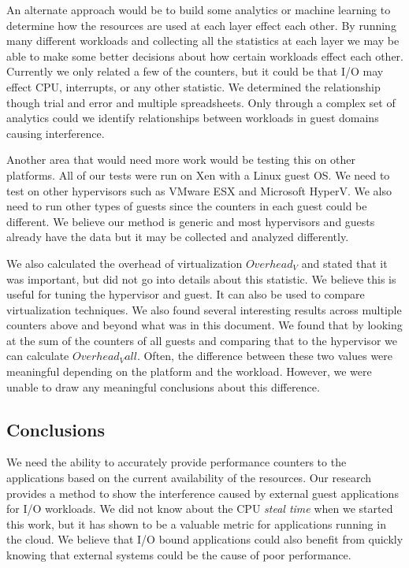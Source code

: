 An alternate approach would be to build some analytics or machine learning to determine how the resources are used at each layer effect each other.  By running many different workloads and collecting all the statistics at each layer we may be able to make some better decisions about how certain workloads effect each other.  Currently we only related a few of the counters, but it could be that I/O may effect CPU, interrupts, or any other statistic.  We determined the relationship though trial and error and multiple spreadsheets.  Only through a complex set of analytics could we identify relationships between workloads in guest domains causing interference.

Another area that would need more work would be testing this on other platforms.  All of our tests were run on Xen with a Linux guest OS.  We need to test on other hypervisors such as VMware ESX and Microsoft HyperV.  We also need to run other types of guests since the counters in each guest could be different.  We believe our method is generic and most hypervisors and guests already have the data but it may be collected and analyzed differently.

We also calculated the overhead of virtualization $Overhead_V$ and stated that it was important, but did not go into details about this statistic.  We believe this is useful for tuning the hypervisor and guest.  It can also be used to compare virtualization techniques.  We also found several interesting results across multiple counters above and beyond what was in this document.  We found that by looking at the sum of the counters of all guests and comparing that to the hypervisor we can calculate $Overhead_Vall$.  Often, the difference between these two values were meaningful depending on the platform and the workload.  However, we were unable to draw any meaningful conclusions about this difference. 


\subsection{Conclusions}
We need the ability to accurately provide performance counters to the applications based on the current availability of the resources.  Our research provides a method to show the interference caused by external guest applications for I/O workloads.  We did not know about the CPU \emph{steal time} when we started this work, but it has shown to be a valuable metric for applications running in the cloud.  We believe that I/O bound applications could also benefit from quickly knowing that external systems could be the cause of poor performance.

